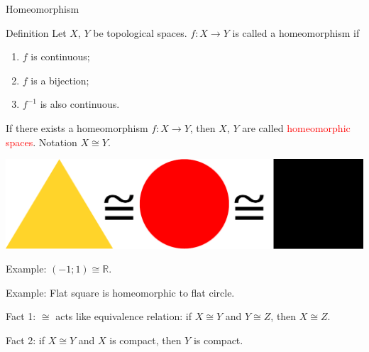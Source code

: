 \documentclass[10pt]{beamer}
\newcommand{\Ro}{\mathbb{R}}
\begin{document}
\begin{frame}{Homeomorphism}

\begin{block}{Definition}
Let $X$, $Y$ be topological spaces. $f\colon X\to Y$ is called a homeomorphism if
\begin{enumerate}
  \item $f$ is continuous;
  \item $f$ is a bijection;
  \item $f^{-1}$ is also continuous.
\end{enumerate}
If there exists a homeomorphism $f\colon X\to Y$, then $X$, $Y$ are called \textcolor{red}{homeomorphic spaces}. Notation $X\cong Y$.
\end{block}

\begin{center}
\includegraphics[scale = 0.2]{pictures/schad1.pdf}
\end{center}

\pause

Example: $(-1;1)\cong \Ro$.

Example: Flat square is homeomorphic to flat circle.

Fact 1: $\cong$ acts like equivalence relation: if $X\cong Y$ and $Y\cong Z$, then $X\cong Z$.

Fact 2: if $X\cong Y$ and $X$ is compact, then $Y$ is compact.

\end{frame}
\end{document}
